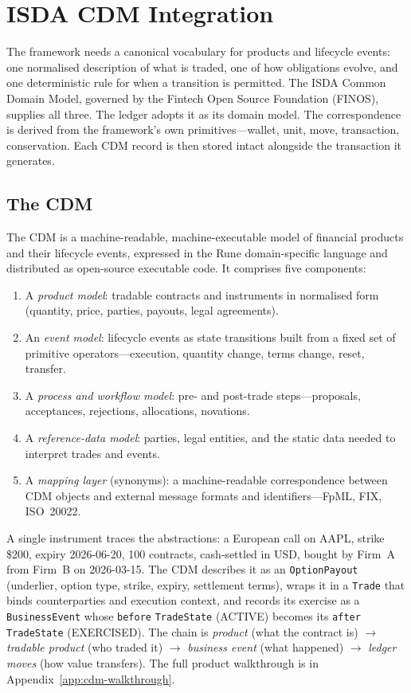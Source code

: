 \section{ISDA CDM Integration}
\label{sec:sec13}\label{sec:cdm}

The framework needs a canonical vocabulary for products and lifecycle events: one normalised description of what is traded, one of how obligations evolve, and one deterministic rule for when a transition is permitted. The ISDA Common Domain Model, governed by the Fintech Open Source Foundation (FINOS), supplies all three. The ledger adopts it as its domain model. The correspondence is derived from the framework's own primitives---wallet, unit, move, transaction, conservation. Each CDM record is then stored intact alongside the transaction it generates.

\subsection{The CDM}

The CDM is a machine-readable, machine-executable model of financial products and their lifecycle events, expressed in the Rune domain-specific language and distributed as open-source executable code. It comprises five components:

\begin{enumerate}[nosep]
\item A \textit{product model}: tradable contracts and instruments in normalised form (quantity, price, parties, payouts, legal agreements).
\item An \textit{event model}: lifecycle events as state transitions built from a fixed set of primitive operators---execution, quantity change, terms change, reset, transfer.
\item A \textit{process and workflow model}: pre- and post-trade steps---proposals, acceptances, rejections, allocations, novations.
\item A \textit{reference-data model}: parties, legal entities, and the static data needed to interpret trades and events.
\item A \textit{mapping layer} (synonyms): a machine-readable correspondence between CDM objects and external message formats and identifiers---FpML, FIX, ISO~20022.
\end{enumerate}

A single instrument traces the abstractions: a European call on AAPL, strike \$200, expiry 2026-06-20, 100 contracts, cash-settled in USD, bought by Firm~A from Firm~B on 2026-03-15. The CDM describes it as an \texttt{OptionPayout} (underlier, option type, strike, expiry, settlement terms), wraps it in a \texttt{Trade} that binds counterparties and execution context, and records its exercise as a \texttt{BusinessEvent} whose \texttt{before} \texttt{TradeState} (ACTIVE) becomes its \texttt{after} \texttt{TradeState} (EXERCISED). The chain is \emph{product} (what the contract is) $\to$ \emph{tradable product} (who traded it) $\to$ \emph{business event} (what happened) $\to$ \emph{ledger moves} (how value transfers). The full product walkthrough is in Appendix~\ref{app:cdm-walkthrough}.

